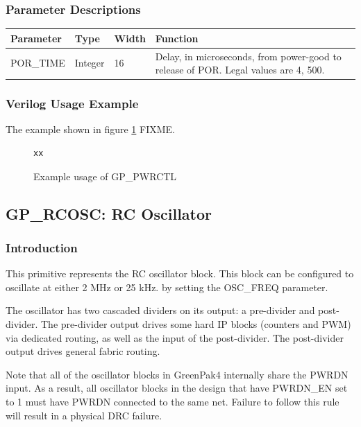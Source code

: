 \documentclass{article}
\begin{document}
\subsubsection{Parameter Descriptions}

\begin{tabularx}{5in}{|l|l|l|X|}
\hline
{\bfseries Parameter} & {\bfseries Type} & {\bfseries Width} & {\bfseries Function} \\
\hline
POR\_TIME & Integer & 16 & Delay, in microseconds, from power-good to release of POR. Legal values are 4, 500.\\
\hline
\end{tabularx}

\subsubsection{Verilog Usage Example}

The example shown in figure \ref{gp-pwrctl-example} FIXME.

\begin{figure}[h]
\begin{lstlisting}
xx
\end{lstlisting}
\caption{Example usage of GP\_PWRCTL}
\label{gp-pwrctl-example}
\end{figure}


\pagebreak
\subsection{GP\_RCOSC: RC Oscillator}

\subsubsection{Introduction}
This primitive represents the RC oscillator block. This block can be configured to oscillate at either 2 MHz or 25 kHz. 
by setting the OSC\_FREQ parameter.

The oscillator has two cascaded dividers on its output: a pre-divider and post-divider. The pre-divider output drives 
some hard IP blocks (counters and PWM) via dedicated routing, as well as the input of the post-divider. The 
post-divider output drives general fabric routing.

Note that all of the oscillator blocks in GreenPak4 internally share the PWRDN input. As a result, all oscillator 
blocks in the design that have PWRDN\_EN set to 1 must have PWRDN connected to the same net. Failure to follow this 
rule will result in a physical DRC failure.
\end{document}
